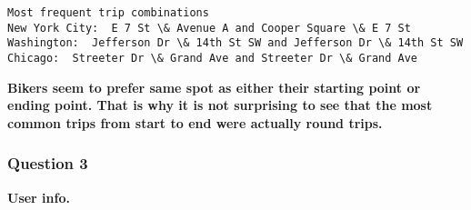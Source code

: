 \documentclass[11pt]{article}
\begin{document}
    \begin{Verbatim}[commandchars=\\\{\}]
Most frequent trip combinations 
New York City:  E 7 St \& Avenue A and Cooper Square \& E 7 St 
Washington:  Jefferson Dr \& 14th St SW and Jefferson Dr \& 14th St SW 
Chicago:  Streeter Dr \& Grand Ave and Streeter Dr \& Grand Ave 

    \end{Verbatim}

    \textbf{Bikers seem to prefer same spot as either their starting point
or ending point. That is why it is not surprising to see that the most
common trips from start to end were actually round trips.}

    \hypertarget{question-3}{%
\subsubsection{Question 3}\label{question-3}}

\textbf{User info.}
\end{document}
